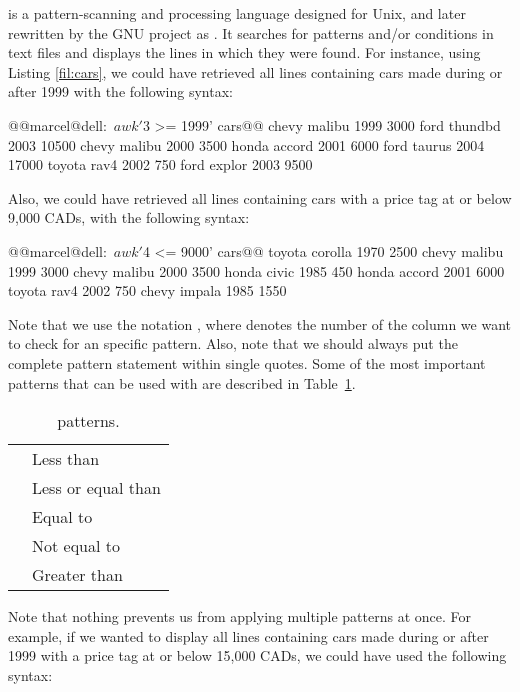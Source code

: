  is a pattern-scanning and processing language designed for Unix, and later rewritten by the \acs{GNU} project as . It searches for patterns and/or conditions in text files and displays the lines in which they were found. For instance, using Listing \ref{fil:cars}, we could have retrieved all lines containing cars made during or after 1999 with the following syntax:
\begin{command_line}[make]
@@marcel@dell:~$ awk '$3 >= 1999' cars@@
chevy malibu 1999 3000
ford thundbd 2003 10500
chevy malibu 2000 3500
honda accord 2001 6000
ford taurus 2004 17000
toyota rav4 2002 750
ford explor 2003 9500
\end{command_line}

Also, we could have retrieved all lines containing cars with a price tag at or below 9,000 CADs, with the following syntax:

\begin{command_line}[make]
@@marcel@dell:~$ awk '$4 <= 9000' cars@@
toyota corolla 1970 2500
chevy malibu 1999 3000
chevy malibu 2000 3500
honda civic 1985 450
honda accord 2001 6000
toyota rav4 2002 750
chevy impala 1985 1550
\end{command_line}

Note that we use the notation , where  denotes the number of the column we want to check for an specific pattern. Also, note that we should always put the complete pattern statement within single quotes. Some of the most important patterns that can be used with  are described in Table~\ref{tab:awk_patterns}.

\begin{table}[!htbp]
   \myfloatalign
   \begin{tabularx}{\textwidth}{Xp{105mm}} \toprule
     \mycommand{<} & Less than \\
     \mycommand{<=} & Less or equal than\\
     \mycommand{==} & Equal to \\
     \mycommand{!=} & Not equal to\\
	 \mycommand{>} & Greater than\\
   \bottomrule
   \end{tabularx}
\caption{ patterns.}
\label{tab:awk_patterns}
\end{table}

Note that nothing prevents us from applying multiple patterns at once. For example, if we wanted to display all lines containing cars made during or after 1999 with a price tag at or below 15,000 CADs, we could have used the following syntax:

